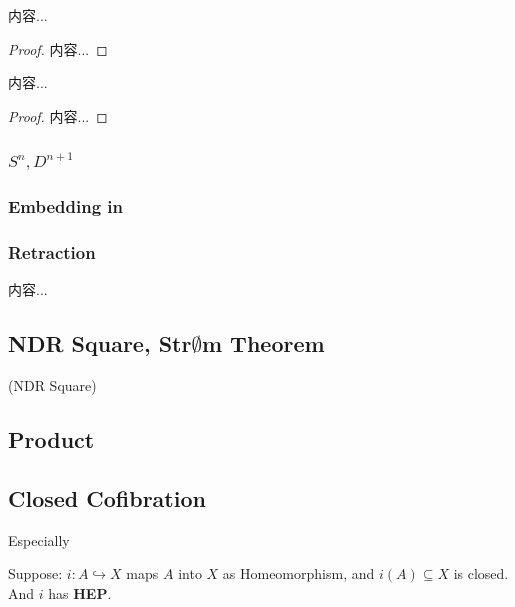 \documentclass[Total.tex]{subfiles}
\begin{document}
					\begin{proposition}
						内容...
					\end{proposition}
					\begin{proof}
						内容...
					\end{proof}
					
					\begin{corollary}
						内容...
					\end{corollary}
					\begin{proof}
						内容...
					\end{proof}
				\subsubsection{$S^n,D^{n+1}$}
				\subsubsection{Embedding in }
				\subsubsection{Retraction}
				
				\begin{Def}
					内容...
				\end{Def}
			\subsection{NDR Square, Str$\emptyset$m Theorem}
				\begin{Def}
					(NDR Square)
				\end{Def}
			\subsection{Product}
			\subsection{Closed Cofibration}
			
				Especially
				\begin{Def}
					Suppose: $i:A\hookrightarrow X$ maps $A$ into $X$ as Homeomorphism, and $i(A)\subseteq X$ is closed. And $i$ has \textbf{HEP}.
				\end{Def}
\end{document}
